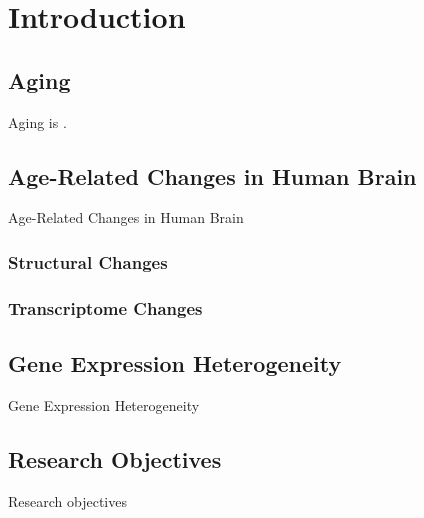 \chapter{Introduction}
\label{chp:b1}

\section{Aging}
 Aging is \cite{Colantuoni2011}.


\section{Age-Related Changes in Human Brain}
Age-Related Changes in Human Brain
\subsection{Structural Changes}
\subsection{Transcriptome Changes}

\section{Gene Expression Heterogeneity}
Gene Expression Heterogeneity

\section{Research Objectives}
 Research objectives



